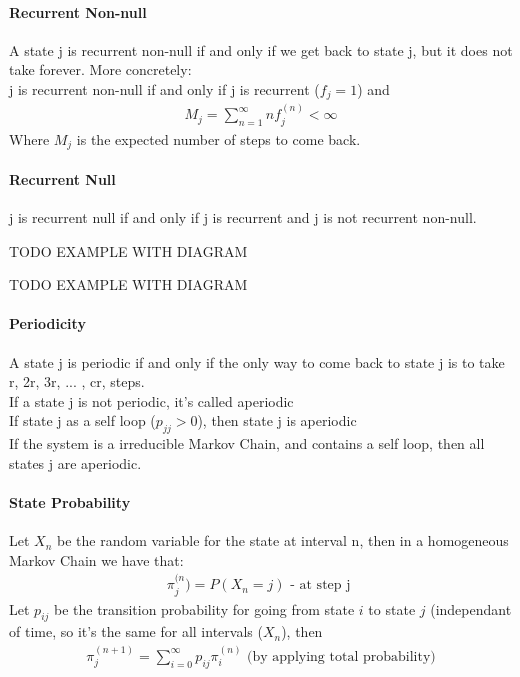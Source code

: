\paragraph{Recurrent Non-null} A state j is recurrent non-null if and only if we
get back to state j, but it does not take forever. More concretely: \\[0.5cm]
j is recurrent non-null if and only if j is recurrent ($f_j = 1$) and
\begin{equation*} \begin{split}
	M_j = \sum_{n=1}^\infty n f_j^{(n)} < \infty
\end{split} \end{equation*}
Where $M_j$ is the expected number of steps to come back.

\paragraph{Recurrent Null} j is recurrent null if and only if j is recurrent and
j is not recurrent non-null.


TODO EXAMPLE WITH DIAGRAM

TODO EXAMPLE WITH DIAGRAM

\paragraph{Periodicity} A state j is periodic if and only if the only way to
come back to state j is to take r, 2r, 3r, ... , cr, steps.  \\[0.5cm]

If a state j is not periodic, it's called aperiodic \\[0.5cm]

If state j as a self loop ($p_{jj} > 0$), then state j is aperiodic \\[0.5cm]

If the system is a irreducible Markov Chain, and contains a self loop, then all
states j are aperiodic.

\paragraph{State Probability} 
Let $X_n$ be the random variable for the state at interval n, then in a
homogeneous Markov Chain we have that:
\begin{equation*} \begin{split}
	\pi_j^{(n}) = P(X_n = j) \mbox{ - at step j }
\end{split} \end{equation*}
Let $p_{ij}$ be the transition probability for going from state $i$ to state $j$
(independant of time, so it's the same for all intervals ($X_n$), then
\begin{equation*} \begin{split}
	\pi_j^{(n+1)} = \sum_{i=0}^\infty p_{ij} \pi_i^{(n)}
	\mbox{ (by applying total probability)}
\end{split} \end{equation*}

